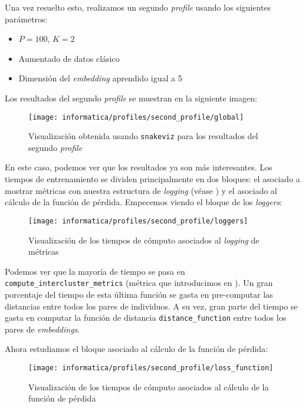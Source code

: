 Una vez resuelto esto, realizamos un segundo \textit{profile} usando los siguientes parámetros:

\begin{itemize}
    \item $P = 100$, $K = 2$
    \item Aumentado de datos clásico
    \item Dimensión del \textit{embedding} aprendido igual a 5
\end{itemize}

Los resultados del segundo \textit{profile} se muestran en la siguiente imagen:

\begin{figure}[H]
    \centering
    \texttt{[image: informatica/profiles/second\_profile/global]}
    \caption{Visualización obtenida usando \lstinline{snakeviz} para los resultados del segundo \textit{profile}}
\end{figure}

En este caso, podemos ver que los resultados ya son más interesantes. Los tiempos de entrenamiento se dividen principalmente en dos bloques: el asociado a mostrar métricas con nuestra estructura de \textit{logging} (véase ) y el asociado al cálculo de la función de pérdida. Empecemos viendo el bloque de los \textit{loggers}:

\begin{figure}[H]
    \centering
    \texttt{[image: informatica/profiles/second\_profile/loggers]}
    \caption{Visualización de los tiempos de cómputo asociados al \textit{logging} de métricas}
    \label{img:second_profile_tiempos_metricas}
\end{figure}

Podemos ver que la mayoría de tiempo se pasa en \lstinline{compute_intercluster_metrics} (métrica que introducimos en ). Un gran porcentaje del tiempo de esta última función se gasta en pre-computar las distancias entre todos los pares de individuos. A su vez, gran parte del tiempo se gasta en computar la función de distancia \lstinline{distance_function} entre todos los pares de \textit{embeddings}.

Ahora estudiamos el bloque asociado al cálculo de la función de pérdida:

\begin{figure}[H]
    \centering
    \texttt{[image: informatica/profiles/second\_profile/loss\_function]}
    \caption{Visualización de los tiempos de cómputo asociados al cálculo de la función de pérdida}
\end{figure}

